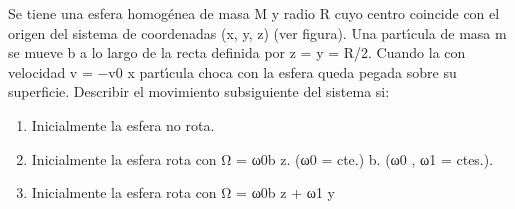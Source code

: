 \documentclass[10pt,oneside]{CBFT_book}
\begin{document}
\begin{ejercicios}
\label{ej18}
\item{ \bf }
Se tiene una esfera homogénea de masa M y radio R cuyo centro coincide con el origen del sistema de coordenadas (x, y, z) (ver figura). Una partı́cula de masa m se mueve b a lo largo de la recta definida por z = y = R/2. Cuando la con velocidad v = −v0 x partı́cula choca con la esfera queda pegada sobre su superficie. Describir el movimiento subsiguiente del sistema si:
\begin{enumerate}[label=(\alph*)]
\item Inicialmente la esfera no rota.
\item Inicialmente la esfera rota con Ω = ω0b z. (ω0 = cte.) b. (ω0 , ω1 = ctes.).
\item Inicialmente la esfera rota con Ω = ω0b z + ω1 y
\end{enumerate}

\end{ejercicios}


\end{document}
